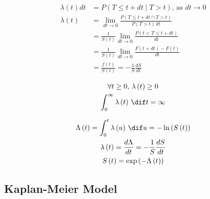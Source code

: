 \begin{subequations}\label{eq:Survival:hazard_def}
\begin{align}
\lambda\left(t\right) dt &= P\left(T \leq t + dt \mid T > t\right),\,\text{as} \,\, dt \to 0 \label{eq:Survival:hazard_def:a} \\
\lambda\left(t\right) &= \lim_{dt \to 0} \frac{P\left(T \leq t + dt \cap T > t\right)}{P\left(T > t\right)\,dt} \label{eq:Survival:hazard_def:b} \\
&= \frac{1}{S\left(t\right)} \lim_{dt \to 0} \frac{P\left(t < T \leq t + dt\right)}{dt} \label{eq:Survival:hazard_def:c} \\
&= \frac{1}{S\left(t\right)} \lim_{dt \to 0} \frac{F\left(t + dt\right) - F\left(t\right)}{dt} \label{eq:Survival:hazard_def:d} \\
&= \frac{f\left(t\right)}{S\left(t\right)} = -\frac{1}{S} \frac{dS}{dt} \label{eq:Survival:hazard_def:e}
\end{align}
\end{subequations}

\begin{subequations}\label{eq:Survival:hazard_cond}
\begin{gather}
\forall t \geq 0, \, \lambda\left(t\right) \geq 0 \label{eq:Survival:hazard_cond:a} \\
\int_{0}^{\infty} \lambda\left(t\right) \, \dif t = \infty \label{eq:Survival:hazard_cond:b}
\end{gather}
\end{subequations}

\begin{subequations}\label{eq:Survival:cum_hazard}
\begin{gather}
\Lambda\left(t\right) = \int_{0}^{t} \lambda\left(u\right) \, \dif u = - \ln\left(S\left(t\right)\right) \label{eq:Survival:cum_hazard:def} \\
\lambda\left(t\right) = \frac{d\Lambda}{dt} = -\frac{1}{S} \frac{dS}{dt} \label{eq:Survival:cum_hazard:to_lambda} \\
S\left(t\right) = \exp\left(-\Lambda\left(t\right)\right) \label{eq:Survival:cum_hazard:to_S}
\end{gather}
\end{subequations}

\subsection{Kaplan-Meier Model}
\label{additional:Survival:km}

